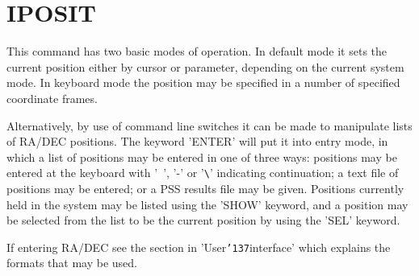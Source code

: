 \documentclass{book}
\renewcommand{\_}{{\tt\char'137}}     %
\begin{document}
\section{IPOSIT}
This command has two basic modes of operation. In default mode it
sets the current position either by cursor or parameter, depending on
the current system mode. In keyboard mode the position may be
specified in a number of specified coordinate frames.
 
Alternatively, by use of command line switches it can be made to
manipulate lists of RA/DEC positions. The keyword 'ENTER' will
put it into entry mode, in which a list of positions may be
entered in one of three ways: positions may be entered at the
keyboard with '~', '-' or '\verb+\+' indicating continuation; a text
file of positions may be entered; or a PSS results file may be
given. Positions currently held in the system may be listed
using the 'SHOW' keyword, and a position may be selected from
the list to be the current position by using the 'SEL' keyword.
 
If entering RA/DEC see the section in 'User\_interface' which
explains the formats that may be used.
 
\end{document}
